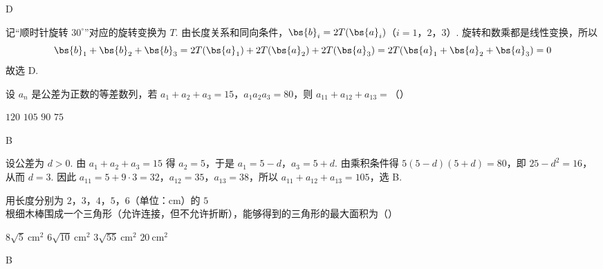 \begin{answer}
D
\end{answer}

\begin{solution}
记“顺时针旋转 \(30^\circ\)”对应的旋转变换为 \(T\). 由长度关系和同向条件，\(\bs{b}_i=2T(\bs{a}_i)\)（\(i=1\)，\(2\)，\(3\)）. 旋转和数乘都是线性变换，所以
\[
\bs{b}_1+\bs{b}_2+\bs{b}_3=2T(\bs{a}_1)+2T(\bs{a}_2)+2T(\bs{a}_3)=2T(\bs{a}_1+\bs{a}_2+\bs{a}_3)=0
\]
故选 D.
\end{solution}

\begin{problem}
设 \(a_n\) 是公差为正数的等差数列，若 \(a_1+a_2+a_3=15\)，\(a_1a_2a_3=80\)，则 \(a_{11}+a_{12}+a_{13}=\)（\quad）

\choices
    {\(120\)}
    {\(105\)}
    {\(90\)}
    {\(75\)}
\end{problem}

\begin{answer}
B
\end{answer}

\begin{solution}
设公差为 \(d>0\). 由 \(a_1+a_2+a_3=15\) 得 \(a_2=5\)，于是 \(a_1=5-d\)，\(a_3=5+d\). 由乘积条件得 \(5(5-d)(5+d)=80\)，即 \(25-d^2=16\)，从而 \(d=3\). 因此 \(a_{11}=5+9\cdot3=32\)，\(a_{12}=35\)，\(a_{13}=38\)，所以 \(a_{11}+a_{12}+a_{13}=105\)，选 B.
\end{solution}

\begin{problem}
用长度分别为 \(2\)，\(3\)，\(4\)，\(5\)，\(6\)（单位：\(\mathrm{cm}\)）的 \(5\) 根细木棒围成一个三角形（允许连接，但不允许折断），能够得到的三角形的最大面积为（\quad）

\choices
    {\(8\sqrt5\mathrm{~cm}^{2}\)}
    {\(6\sqrt{10}\mathrm{~cm}^{2}\)}
    {\(3\sqrt{55}\mathrm{~cm}^{2}\)}
    {\(20\mathrm{~cm}^{2}\)}
\end{problem}

\begin{answer}
B
\end{answer}

